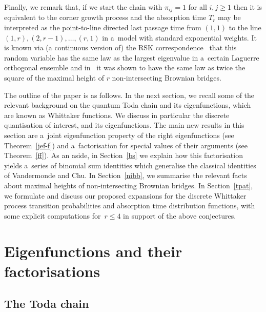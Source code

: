 \documentclass[pdftex]{sigma}
\theoremstyle{definition}
\begin{document}
Finally, we remark that, if we start the chain with $\pi_{ij}=1$ for all $i,j\ge 1$ then it is equivalent to the corner growth process and the absorption time $T_r$ may be interpreted as the point-to-line directed last passage time from $(1,1)$ to the line $(1,r),(2,r-1),\dots, (r,1)$ in a~model with standard exponential weights. It is known via (a continuous version of) the RSK correspondence~\cite{br,fw,f2010} that this random variable has the same law as the largest eigenvalue in a~certain Laguerre orthogonal ensemble and in~\cite{nr17} it was shown to have the same law as twice the square of the maximal height of $r$ non-intersecting Brownian bridges.

The outline of the paper is as follows. In the next section, we recall some
of the relevant background on the quantum Toda chain and its eigenfunctions,
which are known as Whittaker functions. We discuss in particular the discrete
quantisation of interest, and its eigenfunctions. The main new results in this
section are a~joint eigenfunction property of the right eigenfunctions (see Theorem~\ref{jef-f})
and a~factorisation for special values of their arguments (see Theorem~\ref{ff}).
As an aside, in Section~\ref{bs} we explain how this factorisation
yields a~series of binomial sum identities which generalise the classical identities of
Vandermonde and Chu. In Section~\ref{nibb}, we summarise
the relevant facts about maximal heights of non-intersecting Brownian bridges.
In Section~\ref{tpat}, we formulate and discuss our proposed
expansions for the discrete Whittaker process transition probabilities and absorption time distribution
functions, with some explicit computations for~${r\le 4}$ in support of the above conjectures.

\section{Eigenfunctions and their factorisations}\label{ef}

\subsection{The Toda chain}
\end{document}

